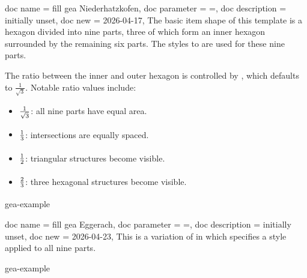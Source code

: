 \documentclass[a4paper,11pt]{article}
\begin{document}
\clearpage
\begin{docTikzKeys}
  {
    {
      doc name        = fill gea Niederhatzkofen,
      doc parameter   = {=},
      doc description = {initially unset},
      doc new         = 2026-04-17,
    }
  }
  The basic item shape of this template is a hexagon divided into nine parts,
  three of which form an inner hexagon surrounded by the remaining six parts. The
  styles  to  are
  used for these nine parts.

  The ratio between the inner and outer hexagon is controlled by
  , which defaults to $\frac{1}{\sqrt{3}}$. Notable
  ratio values include:
  \begin{itemize}
  \item $\rule[-2mm]{0mm}{6mm}\frac{1}{\sqrt{3}}$: all nine parts have equal area.
  \item $\rule[-2mm]{0mm}{6mm}\frac13$: intersections are equally spaced.
  \item $\rule[-2mm]{0mm}{6mm}\frac12$: triangular structures become visible.
  \item $\rule[-2mm]{0mm}{6mm}\frac23$: three hexagonal structures become visible.
  \end{itemize}
\begin{dispExample*}{gea-example}
\end{dispExample*}
\end{docTikzKeys}


\begin{docTikzKeys}
  {
    {
      doc name        = fill gea Eggerach,
      doc parameter   = {=},
      doc description = {initially unset},
      doc new         = 2026-04-23,
    }
  }
  This is a variation of  in which
  specifies a style applied to all nine parts.
\begin{dispExample*}{gea-example}
\end{dispExample*}
\end{docTikzKeys}
\end{document}
